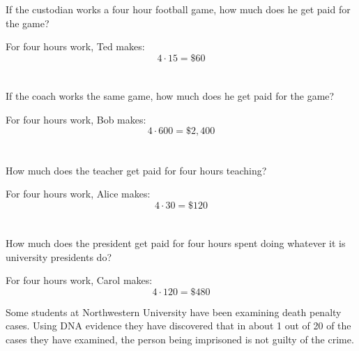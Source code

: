 \documentclass[letterpaper]{exam}
\begin{document}
\begin{questions}
\begin{solution}
    \end{solution}

    \begin{parts}
      \part{}
        If the custodian works a four hour football game, how much does he get
        paid for the game?
        \begin{solution}
          For four hours work, Ted makes:
          \[
            4 \cdot 15 = \$60
          \]
        \end{solution}

      \part{} If the coach works the same game, how much does he get paid for
      the game?
        \begin{solution}
            For four hours work, Bob makes:
            \[
              4 \cdot 600 = \$2,400
            \]
        \end{solution}

      \part{} How much does the teacher get paid for four hours teaching?
        \begin{solution}
            For four hours work, Alice makes: 
            \[
              4 \cdot 30 = \$120
            \]
        \end{solution}

      \part{} How much does the president get paid for four hours spent doing
        whatever it is university presidents do?

        \begin{solution}
            For four hours work, Carol makes:
            \[
              4 \cdot 120 = \$480
            \]
        \end{solution}

    \end{parts}

    \question{}
      Some students at Northwestern University have been examining death
      penalty cases.  Using DNA evidence they have discovered that in about 1
      out of 20 of the cases they have examined, the person being imprisoned
      is not guilty of the crime.  


\end{questions}
\end{document}
